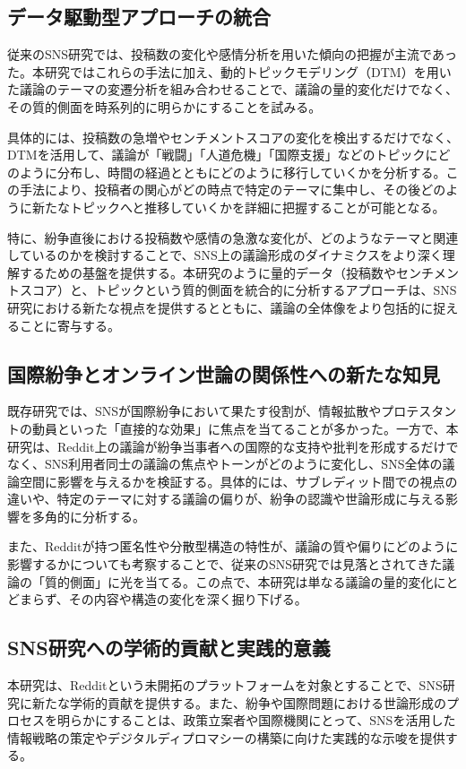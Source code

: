\documentclass[11pt, a4j]{jreport}
\begin{document}
    \subsection{データ駆動型アプローチの統合}
    従来のSNS研究では、投稿数の変化や感情分析を用いた傾向の把握が主流であった。本研究ではこれらの手法に加え、動的トピックモデリング（DTM）を用いた議論のテーマの変遷分析を組み合わせることで、議論の量的変化だけでなく、その質的側面を時系列的に明らかにすることを試みる。

    具体的には、投稿数の急増やセンチメントスコアの変化を検出するだけでなく、DTMを活用して、議論が「戦闘」「人道危機」「国際支援」などのトピックにどのように分布し、時間の経過とともにどのように移行していくかを分析する。この手法により、投稿者の関心がどの時点で特定のテーマに集中し、その後どのように新たなトピックへと推移していくかを詳細に把握することが可能となる。

    特に、紛争直後における投稿数や感情の急激な変化が、どのようなテーマと関連しているのかを検討することで、SNS上の議論形成のダイナミクスをより深く理解するための基盤を提供する。本研究のように量的データ（投稿数やセンチメントスコア）と、トピックという質的側面を統合的に分析するアプローチは、SNS研究における新たな視点を提供するとともに、議論の全体像をより包括的に捉えることに寄与する。

    \subsection{国際紛争とオンライン世論の関係性への新たな知見}
    既存研究では、SNSが国際紛争において果たす役割が、情報拡散やプロテスタントの動員といった「直接的な効果」に焦点を当てることが多かった。一方で、本研究は、Reddit上の議論が紛争当事者への国際的な支持や批判を形成するだけでなく、SNS利用者同士の議論の焦点やトーンがどのように変化し、SNS全体の議論空間に影響を与えるかを検証する。具体的には、サブレディット間での視点の違いや、特定のテーマに対する議論の偏りが、紛争の認識や世論形成に与える影響を多角的に分析する。

    また、Redditが持つ匿名性や分散型構造の特性が、議論の質や偏りにどのように影響するかについても考察することで、従来のSNS研究では見落とされてきた議論の「質的側面」に光を当てる。この点で、本研究は単なる議論の量的変化にとどまらず、その内容や構造の変化を深く掘り下げる。

    \subsection{SNS研究への学術的貢献と実践的意義}
    本研究は、Redditという未開拓のプラットフォームを対象とすることで、SNS研究に新たな学術的貢献を提供する。また、紛争や国際問題における世論形成のプロセスを明らかにすることは、政策立案者や国際機関にとって、SNSを活用した情報戦略の策定やデジタルディプロマシーの構築に向けた実践的な示唆を提供する。
\end{document}
